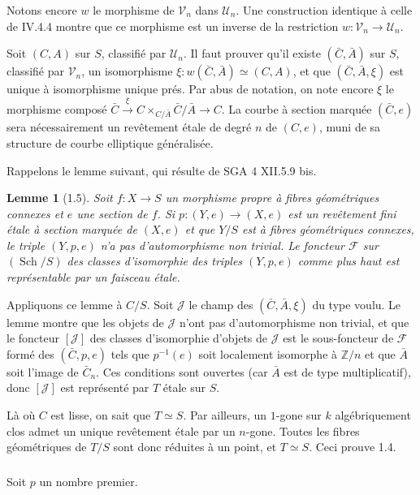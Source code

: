 \documentclass[11pt,a4paper]{amsart}
\theoremstyle{plain}
\newtheorem{lemma}[theorem]{Lemme}
\theoremstyle{definition}
\DeclareMathOperator{\Sch}{Sch}
\newcommand{\CF}{\mathcal{F}}
\newcommand{\CJ}{\mathcal{J}}
\newcommand{\CU}{\mathcal{U}}
\newcommand{\CV}{\mathcal{V}}
\newcommand{\ZZ}{\mathbb{Z}}
\begin{document}
Notons encore $w$ le morphisme de $\CV_n$ dans $\CU_n$. Une construction identique \`a celle de IV.4.4 montre que ce morphisme est un inverse de la restriction $w \colon \CV_n \to \CU_n$.

Soit $(C,A)$ sur $S$, classifi\'e par $\CU_n$. Il faut prouver qu'il existe $(\bar{C}, \bar{A})$ sur $S$, classifi\'e par $\CV_n$, un isomorphisme $\xi \colon w(\bar{C}, \bar{A}) \simeq (C,A)$, et que $(\bar{C}, \bar{A}, \xi)$ est unique \`a isomorphisme unique pr\'es. Par abus de notation, on note encore $\xi$ le morphisme compos\'e $\bar{C} \xrightarrow{\xi} C \times_{C/\bar{A}} \bar{C}/\bar{A} \to C$. La courbe \`a section marqu\'ee $(\bar{C}, e)$ sera n\'ecessairement un rev\^etement \'etale de degr\'e $n$ de $(C,e)$, muni de sa structure de courbe elliptique g\'en\'eralis\'ee.

Rappelons le lemme suivant, qui r\'esulte de SGA 4 XII.5.9 bis.

\begin{lemma}[1.5]
Soit $f \colon X \to S$ un morphisme propre \`a fibres g\'eom\'etriques connexes et $e$ une section de $f$. Si $p \colon (Y,e) \to (X,e)$ est un rev\^etement fini \'etale \`a section marqu\'ee de $(X,e)$ et que $Y/S$ est \`a fibres g\'eom\'etriques connexes, le triple $(Y,p,e)$ n'a pas d'automorphisme non trivial. Le foncteur $\CF$ sur $(\Sch/S)$ des classes d'isomorphie des triples $(Y,p,e)$ comme plus haut est repr\'esentable par un faisceau \'etale.
\end{lemma}

Appliquons ce lemme \`a $C/S$. Soit $\CJ$ le champ des $(\bar{C}, \bar{A}, \xi)$ du type voulu. Le lemme montre que les objets de $\CJ$ n'ont pas d'automorphisme non trivial, et que le foncteur $[\CJ]$ des classes d'isomorphie d'objets de $\CJ$ est le sous-foncteur de $\CF$ form\'e des $(\bar{C}, p, e)$ tels que $p^{-1}(e)$ soit localement isomorphe \`a $\ZZ/n$ et que $\bar{A}$ soit l'image de $\bar{C}_n$. Ces conditions sont ouvertes (car $\bar{A}$ est de type multiplicatif), donc $[\CJ]$ est repr\'esent\'e par $T$ \'etale sur $S$.

L\`a o\`u $C$ est lisse, on sait que $T \simeq S$. Par ailleurs, un $1$-gone sur $k$ alg\'ebriquement clos admet un unique rev\^etement \'etale par un $n$-gone. Toutes les fibres g\'eom\'etriques de $T/S$ sont donc r\'eduites \`a un point, et $T \simeq S$. Ceci prouve 1.4.

\subsubsection{}
Soit $p$ un nombre premier.
\end{document}
